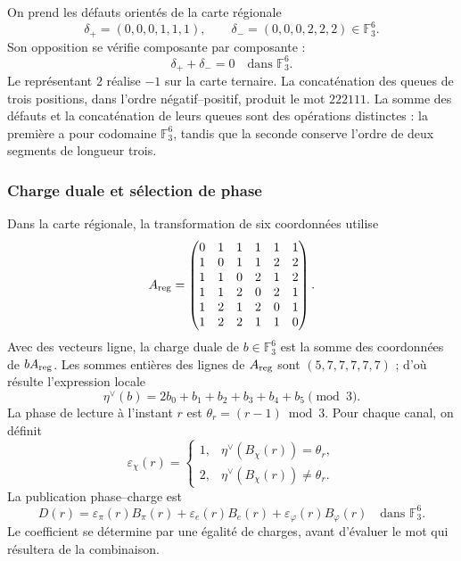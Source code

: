 On prend les défauts orientés de la carte régionale
\[
 \delta_+=(0,0,0,1,1,1),\qquad
 \delta_-=(0,0,0,2,2,2)\in\mathbb F_3^6.
\]
Son opposition se vérifie composante par composante :
\[
 \delta_++\delta_-=0\quad\text{dans }\mathbb F_3^6.
\]
Le représentant $2$ réalise $-1$ sur la carte ternaire. La concaténation
des queues de trois positions, dans l'ordre négatif--positif, produit
le mot $222111$. La somme des défauts et la concaténation de leurs
queues sont des opérations distinctes : la première a pour codomaine
$\mathbb F_3^6$, tandis que la seconde conserve l'ordre de deux
segments de longueur trois.

\subsubsection{Charge duale et sélection de phase}

Dans la carte régionale, la transformation de six coordonnées utilise
\[
 A_{\rm reg}=
 \begin{pmatrix}
 0&1&1&1&1&1\\
 1&0&1&1&2&2\\
 1&1&0&2&1&2\\
 1&1&2&0&2&1\\
 1&2&1&2&0&1\\
 1&2&2&1&1&0
 \end{pmatrix}.
\]
Avec des vecteurs ligne, la charge duale de $b\in\mathbb F_3^6$ est la somme
des coordonnées de $bA_{\rm reg}$. Les sommes entières des lignes de
$A_{\rm reg}$ sont $(5,7,7,7,7,7)$ ; d'où résulte l'expression locale
\begin{equation}
 \eta^\vee(b)=2b_0+b_1+b_2+b_3+b_4+b_5\pmod3.
 \label{eq:kdes-cargadual}
\end{equation}
La phase de lecture à l'instant $r$ est
$\theta_r=(r-1)\bmod3$. Pour chaque canal, on définit
\[
 \varepsilon_\chi(r)=
 \begin{cases}
 1,&\eta^\vee(B_\chi(r))=\theta_r,\\
 2,&\eta^\vee(B_\chi(r))\ne\theta_r.
 \end{cases}
\]
La publication phase--charge est
\begin{equation}
 D(r)=\varepsilon_\pi(r)B_\pi(r)
      +\varepsilon_e(r)B_e(r)
      +\varepsilon_\varphi(r)B_\varphi(r)
      \quad\text{dans }\mathbb F_3^6.
 \label{eq:kdes-fasecarga}
\end{equation}
Le coefficient se détermine par une égalité de charges, avant d'évaluer le mot qui résultera de la combinaison.


